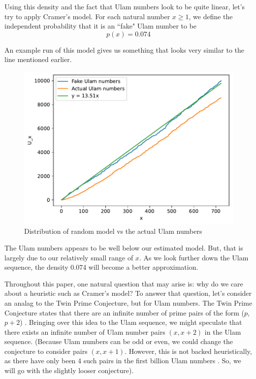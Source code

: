 \documentclass[conference]{IEEEtran}
\begin{document}
Using this density and the fact that Ulam numbers look to be quite linear, let's try to apply Cramer's model. For each natural number $x \ge 1$, we define the independent probability that it is an ``fake" Ulam number to be \[p(x) = 0.074\]

An example run of this model gives us something that looks very similar to the line mentioned earlier.

\begin{figure}[H]
  \centering
  \includegraphics[width=\linewidth,keepaspectratio]{../images/Ulam_cramer.pdf}
  \caption{Distribution of random model vs the actual Ulam numbers}
\end{figure}

The Ulam numbers appears to be well below our estimated model. But, that is largely due to our relatively small range of $x$. As we look further down the Ulam sequence, the density 0.074 will become a better approximation.

Throughout this paper, one natural question that may arise is: why do we care about a heuristic such as Cramer's model? To answer that question, let's consider an analag to the Twin Prime Conjecture, but for Ulam numbers. The Twin Prime Conjecture states that there are an infinite number of prime pairs of the form ($p$, $p + 2$) \cite{b3}. Bringing over this idea to the Ulam sequence, we might speculate that there exists an infinite number of Ulam number pairs $(x, x + 2)$ in the Ulam sequence. (Because Ulam numbers can be odd or even, we could change the conjecture to consider pairs $(x, x + 1)$. However, this is not backed heuristically, as there have only been 4 such pairs in the first billion Ulam numbers \cite{b2}. So, we will go with the slightly looser conjecture). 
\end{document}
